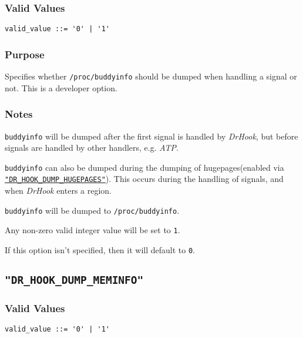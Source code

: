 \subsubsection{Valid Values}
\vspace{-2ex}
\verb+valid_value ::= '0' | '1'+ 

\vspace{-2ex}
\subsubsection{Purpose}
\vspace{-2ex}
Specifies whether \verb|/proc/buddyinfo| should be dumped when handling a signal or not. This is a developer option.

\vspace{-2ex}
\subsubsection{Notes}
\vspace{-2ex}
\texttt{buddyinfo} will be dumped after the first signal is handled by \textit{DrHook}, but before signals are handled by other handlers, e.g. \textit{ATP}.

\texttt{buddyinfo} can also be dumped during the dumping of hugepages(enabled via \hyperref[section:flags:DR_HOOK_DUMP_HUGEPAGES]{\texttt{"DR\_HOOK\_DUMP\_HUGEPAGES"}}). This occurs during the handling of signals, and when \textit{DrHook} enters a region.

\texttt{buddyinfo} will be dumped to \verb|/proc/buddyinfo|.

Any non-zero valid integer value will be set to \verb|1|.

If this option isn't specified, then it will default to \verb|0|.



\subsection{\texttt{"DR\_HOOK\_DUMP\_MEMINFO"}}
\label{section:flags:DR_HOOK_DUMP_MEMINFO}
\vspace{-2ex}
\subsubsection{Valid Values}
\vspace{-2ex}
\verb+valid_value ::= '0' | '1'+ 

